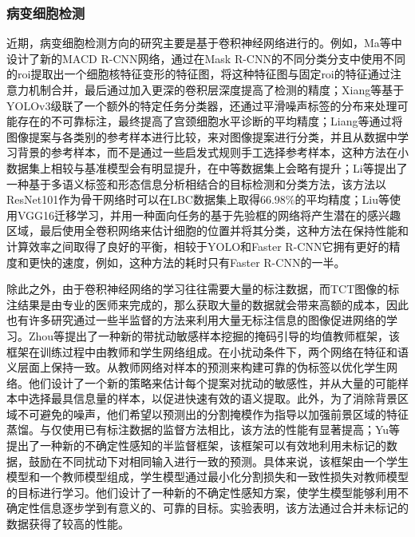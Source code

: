 \subsubsection{病变细胞检测}
\par 近期，病变细胞检测方向的研究主要是基于卷积神经网络进行的。例如，Ma等\cite{ma2020macd}中设计了新的MACD R-CNN网络，通过在Mask R-CNN的不同分类分支中使用不同的roi提取出一个细胞核特征变形的特征图，将这种特征图与固定roi的特征通过注意力机制合并，最后通过加入更深的卷积层深度提高了检测的精度；Xiang等\cite{xiang2020novel}基于YOLOv3级联了一个额外的特定任务分类器，还通过平滑噪声标签的分布来处理可能存在的不可靠标注，最终提高了宫颈细胞水平诊断的平均精度；Liang等\cite{liang2018comparison}通过将图像提案与各类别的参考样本进行比较，来对图像提案进行分类，并且从数据中学习背景的参考样本，而不是通过一些启发式规则手工选择参考样本，这种方法在小数据集上相较与基准模型会有明显提升，在中等数据集上会略有提升；Li等\cite{li2019detection}提出了一种基于多语义标签和形态信息分析相结合的目标检测和分类方法，该方法以ResNet101作为骨干网络时可以在LBC数据集上取得66.98\%的平均精度；Liu等\cite{liu2018multitask}使用VGG16迁移学习，并用一种面向任务的基于先验框的网络将产生潜在的感兴趣区域，最后使用全卷积网络来估计细胞的位置并将其分类，这种方法在保持性能和计算效率之间取得了良好的平衡，相较于YOLO和Faster R-CNN它拥有更好的精度和更快的速度，例如，这种方法的耗时只有Faster R-CNN的一半。
\par 除此之外，由于卷积神经网络的学习往往需要大量的标注数据，而TCT图像的标注结果是由专业的医师来完成的，那么获取大量的数据就会带来高额的成本，因此也有许多研究\cite{zhou2020deep}\cite{yu2019uncertainty}通过一些半监督的方法来利用大量无标注信息的图像促进网络的学习。Zhou等\cite{zhou2020deep}提出了一种新的带扰动敏感样本挖掘的掩码引导的均值教师框架，该框架在训练过程中由教师和学生网络组成。在小扰动条件下，两个网络在特征和语义层面上保持一致。从教师网络对样本的预测来构建可靠的伪标签以优化学生网络。他们设计了一个新的策略来估计每个提案对扰动的敏感性，并从大量的可能样本中选择最具信息量的样本，以促进快速有效的语义提取。此外，为了消除背景区域不可避免的噪声，他们希望以预测出的分割掩模作为指导以加强前景区域的特征蒸馏。与仅使用已有标注数据的监督方法相比，该方法的性能有显著提高；Yu等\cite{yu2019uncertainty}提出了一种新的不确定性感知的半监督框架，该框架可以有效地利用未标记的数据，鼓励在不同扰动下对相同输入进行一致的预测。具体来说，该框架由一个学生模型和一个教师模型组成，学生模型通过最小化分割损失和一致性损失对教师模型的目标进行学习。他们设计了一种新的不确定性感知方案，使学生模型能够利用不确定性信息逐步学到有意义的、可靠的目标。实验表明，该方法通过合并未标记的数据获得了较高的性能。
